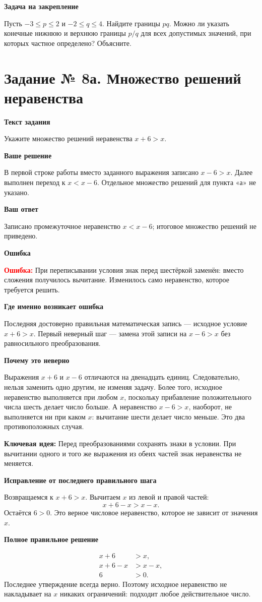 \documentclass[12pt,a4paper]{article}
\newcommand{\err}{\textcolor{red}{\textbf{Ошибка:}}}
\newcommand{\idea}{\textcolor{blue!60!black}{\textbf{Ключевая идея:}}}
\newcommand{\reviewhead}[1]{\medskip\textbf{#1}\par}
\begin{document}
\reviewhead{Задача на закрепление}
Пусть $-3\le p\le2$ и $-2\le q\le4$. Найдите границы $pq$. Можно ли указать конечные нижнюю и верхнюю границы $p/q$ для всех допустимых значений, при которых частное определено? Объясните.

\newpage
{}\label{task:8a}
\section*{Задание № 8а. Множество решений неравенства}
\reviewhead{Текст задания}
Укажите множество решений неравенства $x+6>x$.

\reviewhead{Ваше решение}
В первой строке работы вместо заданного выражения записано $x-6>x$. Далее выполнен переход к $x<x-6$. Отдельное множество решений для пункта «а» не указано.

\reviewhead{Ваш ответ}
Записано промежуточное неравенство $x<x-6$; итоговое множество решений не приведено.

\reviewhead{Ошибка}
\err{} При переписывании условия знак перед шестёркой заменён: вместо сложения получилось вычитание. Изменилось само неравенство, которое требуется решить.

\reviewhead{Где именно возникает ошибка}
Последняя достоверно правильная математическая запись --- исходное условие $x+6>x$. Первый неверный шаг --- замена этой записи на $x-6>x$ без равносильного преобразования.

\reviewhead{Почему это неверно}
Выражения $x+6$ и $x-6$ отличаются на двенадцать единиц. Следовательно, нельзя заменить одно другим, не изменяя задачу. Более того, исходное неравенство выполняется при любом $x$, поскольку прибавление положительного числа шесть делает число больше. А неравенство $x-6>x$, наоборот, не выполняется ни при каком $x$: вычитание шести делает число меньше. Это два противоположных случая.

\idea{} Перед преобразованиями сохранять знаки в условии. При вычитании одного и того же выражения из обеих частей знак неравенства не меняется.

\reviewhead{Исправление от последнего правильного шага}
Возвращаемся к $x+6>x$. Вычитаем $x$ из левой и правой частей:
\[
x+6-x>x-x.
\]
Остаётся $6>0$. Это верное числовое неравенство, которое не зависит от значения $x$.

\reviewhead{Полное правильное решение}
\begin{align*}
x+6&>x,\\
x+6-x&>x-x,\\
6&>0.
\end{align*}
Последнее утверждение всегда верно. Поэтому исходное неравенство не накладывает на $x$ никаких ограничений: подходит любое действительное число.
\end{document}
